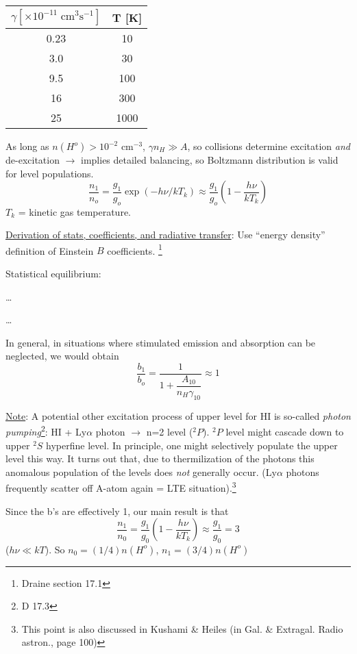\documentclass[11pt]{article}
\newcommand{\mar}[1]{\hspace{0pt}\marginpar{-\textcolor{black}{#1}-}}
\begin{document}
\begin{center}
    \begin{tabular}{c c}
        $\gamma [\times10^{-11}\;\mathrm{cm}^{3}\mathrm{s}^{-1}]$ & T [K]\\
        \hline
        0.23 & 10\\
        3.0 & 30\\
        9.5 & 100\\
        16 & 300\\
        25 & 1000
    \end{tabular}
\end{center}
As long as $n(H^{o}) > 10^{-2}$ cm$^{-3}$, $\gamma n_{H} \gg A$, so
collisions determine excitation \emph{and} de-excitation
$\longrightarrow$ implies detailed balancing, so Boltzmann distribution is
valid for level populations.
\[
    \frac{n_{1}}{n_{o}}
    = \frac{g_{1}}{g_{o}}\exp(-h\nu/kT_{k})
    \approx \frac{g_{1}}{g_{o}} \left( 1 - \frac{h\nu}{kT_{k}} \right)
    \]
$T_{k}$ = kinetic gas temperature.

\mar{35}\underline{Derivation of stats, coefficients, and radiative transfer}:
Use ``energy density'' definition of Einstein $B$ coefficients.
\footnote{Draine section 17.1}

Statistical equilibrium:

\ldots

\mar{36}\ldots

In general, in situations where stimulated emission and absorption can
be neglected, we would obtain
\[
    \frac{b_{1}}{b_{o}} = \frac{1}{1 + \dfrac{A_{10}}{n_{H}\gamma_{10}}}
    \approx 1
    \]

\underline{Note}: A potential other excitation process of upper level for HI
is so-called \textit{photon pumping}\footnote{D 17.3}:
HI + Ly$\alpha$ photon $\rightarrow$ n=2 level ($^{2}P$). $^{2}P$ level might cascade
down to upper $^{2}S$ hyperfine level.
In principle, one might selectively populate the upper level this way.
It turns out that, due to thermilization of the photons this anomalous
population of the levels does \emph{not} generally occur. (Ly$\alpha$ photons
frequently scatter off A-atom again = LTE situation).\footnote{
    This point is also discussed in Kushami \& Heiles (in Gal. \&
    Extragal. Radio astron., page 100)}

\mar{37}Since the b's are effectively 1, our \textcolor{bred}{main result}
is that
\[
    \frac{n_{1}}{n_{0}}
    = \frac{g_{1}}{g_{0}} \left( 1 - \frac{h\nu}{kT_{k}} \right)
    \approx \frac{g_{1}}{g_{0}} = 3
    \]
($h\nu \ll kT$). So $n_{0} = (1/4)n(H^{o})$, $n_{1} = (3/4)n(H^{o})$
\end{document}
